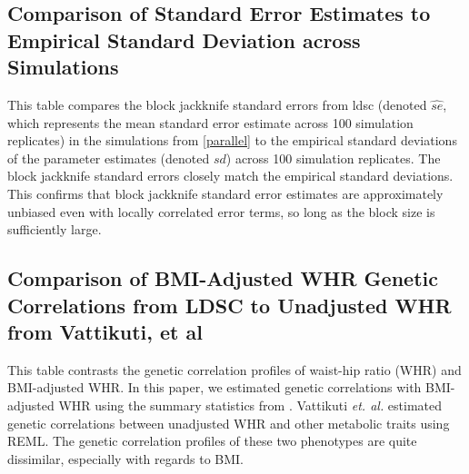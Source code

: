\documentclass[11pt]{article}
\numberwithin{equation}{section}
\numberwithin{definition}{section}
\numberwithin{thm}{section}
\numberwithin{lemma}{section}
\numberwithin{prop}{section}
\numberwithin{cor}{section}
\numberwithin{hyp}{section}
\begin{document}
\subsection{Comparison of Standard Error Estimates to Empirical Standard Deviation across Simulations}
\label{se_sim}

This table compares the block jackknife standard errors from ldsc (denoted $\widehat{se}$, which represents the mean standard error estimate across 100 simulation replicates) in the simulations from \ref{parallel} to the empirical standard deviations of the parameter estimates (denoted $sd$) across 100 simulation replicates. The block jackknife standard errors closely match the empirical standard deviations. This confirms that block jackknife standard error estimates are approximately unbiased even with locally correlated error terms, so long as the block size is sufficiently large.
\newpage
\subsection{Comparison of BMI-Adjusted WHR Genetic Correlations from LDSC to Unadjusted WHR from Vattikuti, et al}
\label{whr}


This table contrasts the genetic correlation profiles of waist-hip ratio (WHR) and BMI-adjusted WHR.
In this paper, we estimated genetic correlations with BMI-adjusted WHR using the summary statistics from \cite{heid2010meta}.
Vattikuti \emph{et. al.} \cite{vattikuti2012heritability}
estimated genetic correlations between unadjusted WHR and other metabolic traits using REML. 
The genetic correlation profiles of these two phenotypes are quite dissimilar, especially with regards to BMI.




%




\newpage


\end{document}
